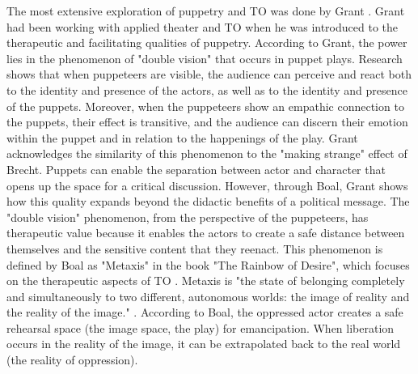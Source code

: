 \documentclass[dissertation,math,vertlayout,pdfa,colorlinks]{aaltoseries}
\begin{document}
The most extensive exploration of puppetry and TO was done by Grant \cite{grantObjectsObjectivesApplied2020}. Grant had been working with applied theater and TO when he was introduced to the therapeutic and facilitating qualities of puppetry. According to Grant, the power lies in the phenomenon of "double vision" \cite{mortonHyperobjectsPhilosophyEcology2013} that occurs in puppet plays. Research shows that when puppeteers are visible, the audience can perceive and react both to the identity and presence of the actors, as well as to the identity and presence of the puppets. Moreover, when the puppeteers show an empathic connection to the puppets, their effect is transitive, and the audience can discern their emotion within the puppet and in relation to the happenings of the play. Grant acknowledges the similarity of this phenomenon to the "making strange" effect of Brecht. Puppets can enable the separation between actor and character that opens up the space for a critical discussion. However, through Boal, Grant shows how this quality expands beyond the didactic benefits of a political message. The "double vision" phenomenon, from the perspective of the puppeteers, has therapeutic value because it enables the actors to create a safe distance between themselves and the sensitive content that they reenact. This phenomenon is defined by Boal as "Metaxis" in the book "The Rainbow of Desire",  which focuses on the therapeutic aspects of TO \cite{boalRainbowDesireBoal2013}. Metaxis is "the state of belonging completely and simultaneously to two different, autonomous worlds: the image of reality and the reality of the image." \cite[p. 43]{boalRainbowDesireBoal2013}. According to Boal, the oppressed actor creates a safe rehearsal space (the image space, the play) for emancipation. When liberation occurs in the reality of the image, it can be extrapolated back to the real world (the reality of oppression).
\end{document}
